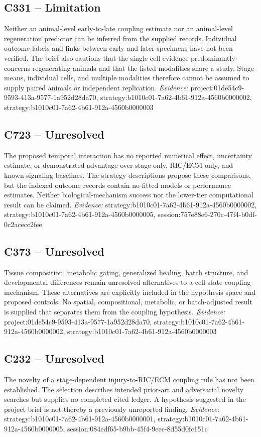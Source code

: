 \documentclass[11pt]{article}
\begin{document}
\subsection{C331 -- Limitation}
Neither an animal-level early-to-late coupling estimate nor an animal-level regeneration predictor can be inferred from the supplied records.
Individual outcome labels and links between early and later specimens have not been verified. The brief also cautions that the single-cell evidence predominantly concerns regenerating animals and that the listed modalities share a study. Stage means, individual cells, and multiple modalities therefore cannot be assumed to supply paired animals or independent replication.
\textit{Evidence: }project:01de54c9-9593-413a-9577-1a952d28da70, strategy:b1010c01-7a62-4b61-912a-4560b0000002, strategy:b1010c01-7a62-4b61-912a-4560b0000003
\subsection{C723 -- Unresolved}
The proposed temporal interaction has no reported numerical effect, uncertainty estimate, or demonstrated advantage over stage-only, RIC/ECM-only, and known-signaling baselines.
The strategy descriptions propose these comparisons, but the indexed outcome records contain no fitted models or performance estimates. Neither biological-mechanism success nor the lower-tier computational result can be claimed.
\textit{Evidence: }strategy:b1010c01-7a62-4b61-912a-4560b0000002, strategy:b1010c01-7a62-4b61-912a-4560b0000005, session:757e88e6-270c-47f4-b0df-0c2acecc2fee
\subsection{C373 -- Unresolved}
Tissue composition, metabolic gating, generalized healing, batch structure, and developmental differences remain unresolved alternatives to a cell-state coupling mechanism.
These alternatives are explicitly included in the hypothesis space and proposed controls. No spatial, compositional, metabolic, or batch-adjusted result is supplied that separates them from the coupling hypothesis.
\textit{Evidence: }project:01de54c9-9593-413a-9577-1a952d28da70, strategy:b1010c01-7a62-4b61-912a-4560b0000002, strategy:b1010c01-7a62-4b61-912a-4560b0000003
\subsection{C232 -- Unresolved}
The novelty of a stage-dependent injury-to-RIC/ECM coupling rule has not been established.
The selection describes intended prior-art and adversarial novelty searches but supplies no completed cited ledger. A hypothesis suggested in the project brief is not thereby a previously unreported finding.
\textit{Evidence: }strategy:b1010c01-7a62-4b61-912a-4560b0000001, strategy:b1010c01-7a62-4b61-912a-4560b0000005, session:084edf65-b9bb-45f4-9eec-8d55d0fc151c
\end{document}
